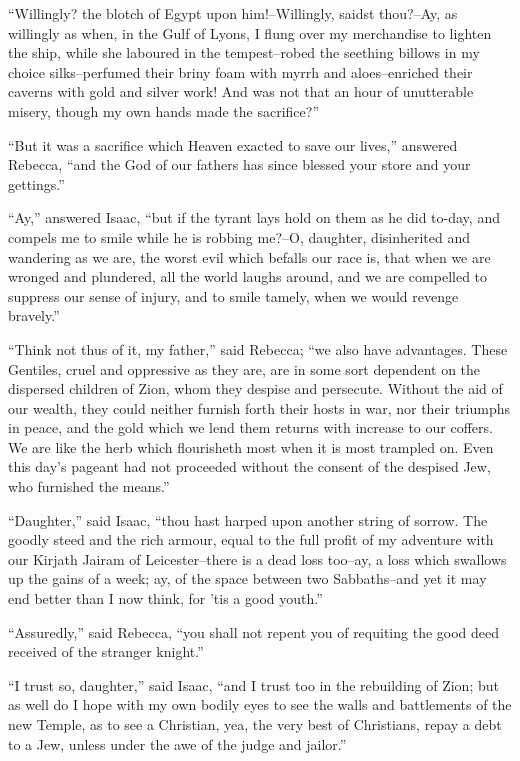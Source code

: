 ``Willingly? the blotch of Egypt upon him!--Willingly, saidst thou?--Ay,
as willingly as when, in the Gulf of Lyons, I flung over my merchandise
to lighten the ship, while she laboured in the tempest--robed the
seething billows in my choice silks--perfumed their briny foam with
myrrh and aloes--enriched their caverns with gold and silver work! And
was not that an hour of unutterable misery, though my own hands made the
sacrifice?''

``But it was a sacrifice which Heaven exacted to save our lives,''
answered Rebecca, ``and the God of our fathers has since blessed your
store and your gettings.''

``Ay,'' answered Isaac, ``but if the tyrant lays hold on them as he did
to-day, and compels me to smile while he is robbing me?--O, daughter,
disinherited and wandering as we are, the worst evil which befalls our
race is, that when we are wronged and plundered, all the world laughs
around, and we are compelled to suppress our sense of injury, and to
smile tamely, when we would revenge bravely.''

``Think not thus of it, my father,'' said Rebecca; ``we also have
advantages. These Gentiles, cruel and oppressive as they are, are in
some sort dependent on the dispersed children of Zion, whom they despise
and persecute. Without the aid of our wealth, they could neither furnish
forth their hosts in war, nor their triumphs in peace, and the gold
which we lend them returns with increase to our coffers. We are like the
herb which flourisheth most when it is most trampled on. Even this day's
pageant had not proceeded without the consent of the despised Jew, who
furnished the means.''

``Daughter,'' said Isaac, ``thou hast harped upon another string of
sorrow. The goodly steed and the rich armour, equal to the full profit
of my adventure with our Kirjath Jairam of Leicester--there is a dead
loss too--ay, a loss which swallows up the gains of a week; ay, of the
space between two Sabbaths--and yet it may end better than I now think,
for 'tis a good youth.''

``Assuredly,'' said Rebecca, ``you shall not repent you of requiting the
good deed received of the stranger knight.''

``I trust so, daughter,'' said Isaac, ``and I trust too in the
rebuilding of Zion; but as well do I hope with my own bodily eyes to see
the walls and battlements of the new Temple, as to see a Christian, yea,
the very best of Christians, repay a debt to a Jew, unless under the awe
of the judge and jailor.''

